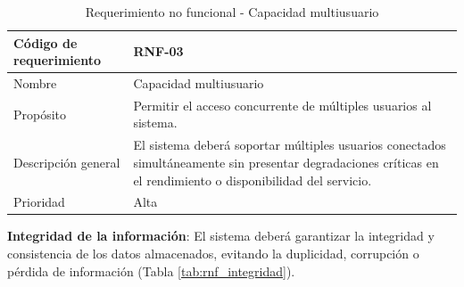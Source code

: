 \begin{table}[H]
    \centering
    \caption{Requerimiento no funcional - Capacidad multiusuario}
    \label{tab:rnf_multiusuario}
    \begin{tabularx}{\textwidth}{|X|X|}
        \hline
        Código de requerimiento & RNF-03                                                                                                                                                         \\ \hline
        Nombre                  & Capacidad multiusuario                                                                                                                                         \\ \hline
        Propósito               & Permitir el acceso concurrente de múltiples usuarios al sistema.                                                                                               \\ \hline
        Descripción general     & El sistema deberá soportar múltiples usuarios conectados simultáneamente sin presentar degradaciones críticas en el rendimiento o disponibilidad del servicio. \\ \hline
        Prioridad               & Alta                                                                                                                                                           \\ \hline
    \end{tabularx}
\end{table}


\textbf{Integridad de la información}: El sistema deberá garantizar la integridad y consistencia de los datos almacenados, evitando la duplicidad, corrupción o pérdida de información (Tabla \ref{tab:rnf_integridad}).

